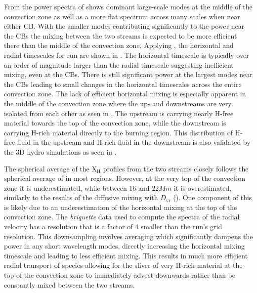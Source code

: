 \documentclass[fleqn,usenatbib]{mnras}
\begin{document}
From  the power spectra of  shows
dominant large-scale modes at the middle of the convection zone as well as a
more flat spectrum across many scales when near either CB. With the smaller
modes contributing significantly to the power near the CBs the mixing between
the two streams is expected to be more efficient there than the middle of the
convection zone. Applying , the horizontal and radial timescales
for run  are shown in . The horizontal timescale is
typically over an order of magnitude larger than the radial timescale suggesting
inefficient mixing, even at the CBs. There is still significant power at the
largest modes near the CBs leading to small changes in the horizontal
timescales across the entire convection zone. The lack of efficient horizontal
mixing is especially apparent in the middle of the convection zone where the up-
and downstreams are very isolated from each other as seen in
. The upstream is carrying nearly H-free material towards
the top of the convection zone, while the downstream is carrying H-rich material
directly to the burning region. This distribution of H-free fluid in the
upstream and H-rich fluid in the downstream is also validated by the 3D hydro
simulations as seen in .

The spherical average of the X$_{\mathrm{H}}$ profiles from the two streams
closely follows the spherical average of  in most regions. However, at
the very top of the convection zone it is underestimated, while between 16 and
$\unit{22}{Mm}$ it is overestimated, similarly to the results of the diffusive
mixing with $D_{\mathrm{vr}}$ (). One component of this
is likely due to an underestimation of the horizontal mixing at the top of the
convection zone. The \textit{briquette} data used to compute the spectra of the
radial velocity has a resolution that is a factor of 4 smaller than the run's
grid resolution. This downsampling involves averaging which significantly
dampens the power in any short wavelength modes, directly increasing the
horizontal mixing timescale and leading to less efficient mixing. This results
in much more efficient radial transport of species allowing for the sliver of
very H-rich material at the top of the convection zone to immediately advect
downwards rather than be constantly mixed between the two streams.
\end{document}
